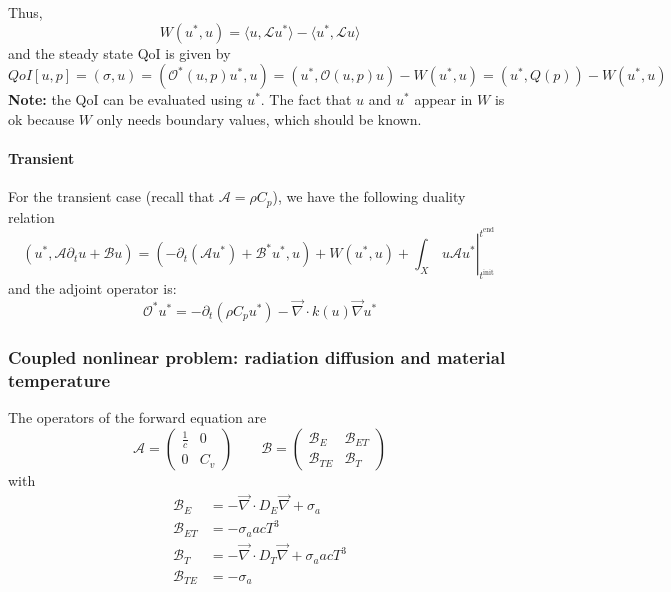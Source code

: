 \documentclass[11pt]{article}
\renewcommand{\div}{\vec{\nabla}\! \cdot \!}
\newcommand{\grad}{\vec{\nabla}}
\newcommand{\be}{\begin{equation}}
\newcommand{\ee}{\end{equation}}
\renewcommand{\O}{\mathcal{O}}
\newcommand{\mc}[1]{\mathcal{#1}}
\newcommand{\us}{{u^\ast}}
\newcommand{\ti}{ {t^{\text{init}}} }
\newcommand{\te}{ {t^{\text{end }}} }
\begin{document}
Thus,
\be
W(\us,u) = \langle u, \mc{L} \us \rangle  -  \langle \us, \mc{L} u \rangle
\ee
and the steady state QoI is given by 
\be
QoI[u,p] = (\sigma, u) = (\O^\ast(u,p)\us, u) = (\us,\O(u,p)u) - W(\us,u) = (\us,Q(p)) - W(\us,u)
\ee
{\bf Note:} the QoI can be evaluated using $\us$. The fact that $u$ and $\us$ appear in $W$ is ok 
because $W$ only needs boundary values, which should be known.

\paragraph{Transient} 
For the transient case (recall that $\mc{A} = \rho C_p$), we have the following duality relation
\be
(\us,\mc{A}\partial_t u + \mc{B}u) = (-\partial_t (\mc{A}\us) +\mc{B}^\ast\us,u) + W(\us,u) + \left. \int_X \, u \mc{A} \us \right|_\ti^\te 
\ee
and the adjoint operator is:
\be
\O^\ast \us = - \partial_t (\rho C_p \us )  -\div k(u) \grad \us  
\ee
\subsubsection{Coupled nonlinear problem: radiation diffusion and material temperature}


The operators of the forward equation are
\be
\mc{A} = 
\begin{pmatrix}
\frac{1}{c} &  0 \\
0           &   C_v
\end{pmatrix}
\qquad
\mc{B} = 
\begin{pmatrix}
\mc{B}_E      &  \mc{B}_{ET} \\
\mc{B}_{TE}   &  \mc{B}_{T} 
\end{pmatrix}
\ee
with 
\begin{align}
\mc{B}_{E}  &= -\div D_E \grad + \sigma_a \\
\mc{B}_{ET} &= -\sigma_a acT^3 \\
\mc{B}_{T}  &= -\div D_T \grad + \sigma_a acT^3 \\
\mc{B}_{TE} &= -\sigma_a  
\end{align}
\end{document}
